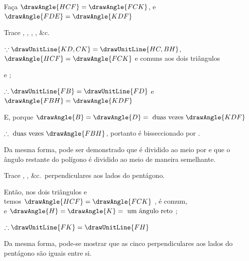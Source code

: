 \documentclass[booklanguage=brazilian]{byrnebook}
\begin{document}
\begin{center}
Faça $\drawAngle{HCF} = \drawAngle{FCK}$, e $\drawAngle{FDE} = \drawAngle{KDF}$ 

Trace , , , , \&c.

$\because \drawUnitLine{KD,CK} = \drawUnitLine{HC,BH}$, $\drawAngle{HCF} = \drawAngle{FCK}$ e  comuns aos dois triângulos %

e
;

$\therefore \drawUnitLine{FB} = \drawUnitLine{FD}$ e $\drawAngle{FBH} = \drawAngle{KDF}$ 

E, porque $\drawAngle{B} = \drawAngle{D} = \mbox{ duas vezes } \drawAngle{KDF}$ %

$\therefore \mbox{ duas vezes } \drawAngle{FBH}$, portanto  é bisseccionado por .

Da mesma forma, pode ser demonstrado que  é dividido ao meio por  e que o ângulo restante do polígono é dividido ao meio de maneira semelhante.

Trace , , \&c.\ perpendiculares aos lados do pentágono.

Então, nos dois triângulos
e
\\
temos $\drawAngle{HCF} = \drawAngle{FCK}$ \byref{\constref},  é comum,\\
e $\drawAngle{H} = \drawAngle{K} = \mbox{ um ângulo reto }$;

$\therefore \drawUnitLine{FK} = \drawUnitLine{FH}$ 
\end{center}

Da mesma forma, pode-se mostrar que as cinco perpendiculares aos lados do pentágono são iguais entre si.
\end{document}
